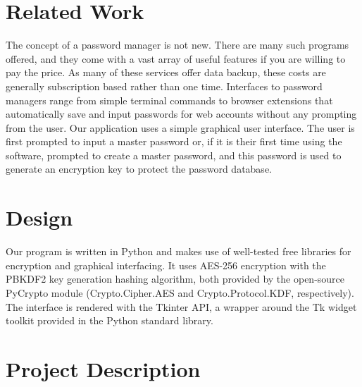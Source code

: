 \documentclass [oneside, letterpaper] {article}
\begin{document}
    \section {Related Work}
        The concept of a password manager is not new. There are many such
        programs offered, and they come with a vast array of useful features if
        you are willing to pay the price. As many of these services offer data
        backup, these costs are generally subscription based rather than one
        time. Interfaces to password managers range from simple terminal
        commands to browser extensions that automatically save and input
        passwords for web accounts without any prompting from the user. Our
        application uses a simple graphical user interface. The user is first
        prompted to input a master password or, if it is their first time using
        the software, prompted to create a master password, and this password is
        used to generate an encryption key to protect the password database.

    \section {Design}
        Our program is written in Python and makes use of well-tested free
        libraries for encryption and graphical interfacing. It uses AES-256
        encryption with the PBKDF2 key generation hashing algorithm, both
        provided by the open-source PyCrypto module (Crypto.Cipher.AES and
        Crypto.Protocol.KDF, respectively). The interface is rendered with
        the Tkinter API, a wrapper around the Tk widget toolkit provided in the
        Python standard library.

    \section {Project Description}
\end{document}
